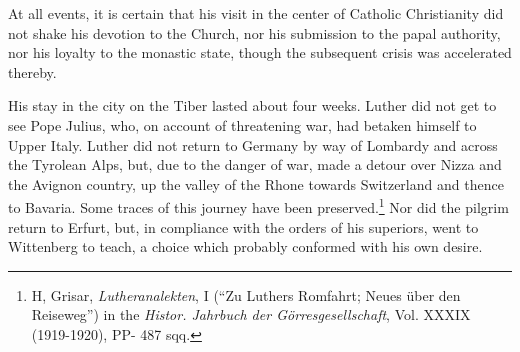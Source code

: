 At all events, it is certain that his visit in the center of Catholic
Christianity did not shake his devotion to the Church, nor his submission
to the papal authority, nor his loyalty to the monastic state,
though the subsequent crisis was accelerated thereby.

His stay in the city on the Tiber lasted about four weeks. Luther
did not get to see Pope Julius, who, on account of threatening war,
had betaken himself to Upper Italy. Luther did not return to Germany
by way of Lombardy and across the Tyrolean Alps, but, due
to the danger of war, made a detour over Nizza and the Avignon
country, up the valley of the Rhone towards Switzerland and thence
to Bavaria. Some traces of this journey have been preserved.\footnote{
H, Grisar, \textit{Lutheranalekten}, I (``Zu Luthers Romfahrt; Neues über den Reiseweg'')
in the \textit{Histor. Jahrbuch der Görresgesellschaft}, Vol. XXXIX (1919-1920), PP- 487 sqq.}
Nor did the pilgrim return to Erfurt, but, in compliance with the orders
of his superiors, went to Wittenberg to teach, a choice which probably
conformed with his own desire.
